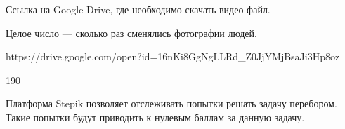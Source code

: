 
Ссылка на Google Drive, где необходимо скачать видео-файл.  

\outputfmtSection

Целое число --- сколько раз сменялись фотографии людей.

\exampleSection


\footnotesize
\begin{myverbbox}[\small]{\vinput}
https://drive.google.com/open?id=16nKi8GgNgLLRd_Z0JjYMjBsaJi3Hp8oz
\end{myverbbox}
\begin{myverbbox}[\small]{\voutput}
190
\end{myverbbox}
\normalsize

\commentsSection
Платформа Stepik позволяет отслеживать попытки решать задачу перебором. Такие попытки будут приводить к нулевым баллам за данную задачу.

